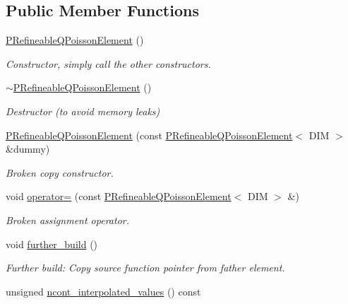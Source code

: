 \subsection*{Public Member Functions}
\begin{DoxyCompactItemize}
\item 
\hyperlink{classoomph_1_1PRefineableQPoissonElement_abb4dd3cc7654c360b87a968da6733f00}{P\+Refineable\+Q\+Poisson\+Element} ()
\begin{DoxyCompactList}\small\item\em Constructor, simply call the other constructors. \end{DoxyCompactList}\item 
\hyperlink{classoomph_1_1PRefineableQPoissonElement_a9ba8ab37c3a1e129050b9e2f45d82ce4}{$\sim$\+P\+Refineable\+Q\+Poisson\+Element} ()
\begin{DoxyCompactList}\small\item\em Destructor (to avoid memory leaks) \end{DoxyCompactList}\item 
\hyperlink{classoomph_1_1PRefineableQPoissonElement_aa57cb66f7febfc2e02ed16799d3d2689}{P\+Refineable\+Q\+Poisson\+Element} (const \hyperlink{classoomph_1_1PRefineableQPoissonElement}{P\+Refineable\+Q\+Poisson\+Element}$<$ D\+IM $>$ \&dummy)
\begin{DoxyCompactList}\small\item\em Broken copy constructor. \end{DoxyCompactList}\item 
void \hyperlink{classoomph_1_1PRefineableQPoissonElement_a4576bfc2714913a2aa58c85308b99097}{operator=} (const \hyperlink{classoomph_1_1PRefineableQPoissonElement}{P\+Refineable\+Q\+Poisson\+Element}$<$ D\+IM $>$ \&)
\begin{DoxyCompactList}\small\item\em Broken assignment operator. \end{DoxyCompactList}\item 
void \hyperlink{classoomph_1_1PRefineableQPoissonElement_a953633adeb9bc3875113d3672c7d525f}{further\+\_\+build} ()
\begin{DoxyCompactList}\small\item\em Further build\+: Copy source function pointer from father element. \end{DoxyCompactList}\item 
unsigned \hyperlink{classoomph_1_1PRefineableQPoissonElement_a1841e8c6ebcea0efc212a871e03dec24}{ncont\+\_\+interpolated\+\_\+values} () const

\end{DoxyCompactItemize}
